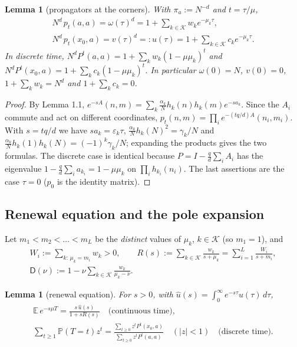 \documentclass[11pt,a4paper]{article}
\newtheorem{lemma}[theorem]{Lemma}
\theoremstyle{definition}
\theoremstyle{remark}
\begin{document}
\begin{lemma}[{propagators at the corners}]
With $\pi_a:=N^{-d}$ and $t=\tau/\mu$,
\begin{gather*}
N^d\,p_{t}(a,a)=\omega(\tau)^d=1+\sum_{k\in\mathcal K}w_ke^{-\mu_k\tau}, \\
N^d\,p_{t}(x_0,a)=v(\tau)^d=:u(\tau)=1+\sum_{k\in\mathcal K}c_ke^{-\mu_k\tau}.
\end{gather*}
In discrete time, $N^dP^t(a,a)=1+\sum_{k}w_k(1-\mu\mu_k)^t$ and $N^dP^t(x_0,a)=1+\sum_kc_k(1-\mu\mu_k)^t$. In particular $\omega(0)=N$, $v(0)=0$, $1+\sum_kw_k=N^d$ and $1+\sum_kc_k=0$.
\end{lemma}

\begin{proof}
By Lemma 1.1, $e^{-sA}(n,m)=\sum_k\frac{\alpha_k}{N}h_k(n)h_k(m)e^{-sa_k}$. Since the $A_i$ commute and act on different coordinates, $p_t(n,m)=\prod_i e^{-(tq/d)A}(n_i,m_i)$. With $s=tq/d$ we have $sa_k=\varepsilon_k\tau$, $\frac{\alpha_k}{N}h_k(N)^2=\gamma_k/N$ and $\frac{\alpha_k}{N}h_k(1)h_k(N)=(-1)^k\gamma_k/N$; expanding the products gives the two formulas. The discrete case is identical because $P=I-\frac qd\sum_iA_i$ has the eigenvalue $1-\frac qd\sum_ia_{k_i}=1-\mu\mu_k$ on $\prod_ih_{k_i}(n_i)$. The last assertions are the case $\tau=0$ ($p_0$ is the identity matrix).
\end{proof}

\subsection{Renewal equation and the pole expansion}

Let $m_1<m_2<\dots<m_L$ be the \emph{distinct} values of $\mu_k$, $k\in\mathcal K$ (so $m_1=1$), and
\begin{gather*}
W_i:=\sum_{k:\,\mu_k=m_i}w_k>0, \qquad R(s):=\sum_{k\in\mathcal K}\frac{w_k}{s+\mu_k}=\sum_{i=1}^L\frac{W_i}{s+m_i}, \\
\mathsf D(\nu):=1-\nu\sum_{k\in\mathcal K}\frac{w_k}{\mu_k-\nu}.
\end{gather*}

\begin{lemma}[{renewal equation}]
For $s>0$, with $\hat u(s)=\int_0^\infty e^{-s\tau}u(\tau)\,d\tau$,
\begin{gather*}
\mathbb E\,e^{-s\mu T}=\frac{s\,\hat u(s)}{1+sR(s)}\quad\text{(continuous time)}, \\
\sum_{t\ge1}\mathbb P(T=t)z^t=\frac{\sum_{t\ge0}z^tP^t(x_0,a)}{\sum_{t\ge0}z^tP^t(a,a)}\quad(|z|<1)\quad\text{(discrete time)}.
\end{gather*}
\end{lemma}
\end{document}
